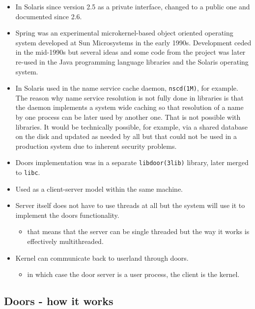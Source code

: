 \begin{itemize}
\item In Solaris since version 2.5 as a private interface, changed to a public
one and documented since 2.6.
\item Spring was an experimental microkernel-based object oriented operating
system developed at Sun Microsystems in the early 1990s. Development ceded in
the mid-1990s but several ideas and some code from the project was later
re-used in the Java programming language libraries and the Solaris operating
system.
\item In Solaris used in the name service cache daemon, \texttt{nscd(1M)}, for
example. The reason why name service resolution is not fully done in libraries
is that the daemon implements a system wide caching so that resolution of a name
by one process can be later used by another one. That is not possible with
libraries. It would be technically possible, for example, via a shared database
on the disk and updated as needed by all but that could not be used in a
production system due to inherent security problems.
\item Doors implementation was in a separate \texttt{libdoor(3lib)} library,
later merged to \texttt{libc}.
\item Used as a client-server model within the same machine.
\item Server itself does not have to use threads at all but the system will use
it to implement the doors functionality.
	\begin{itemize}
	\item that means that the server can be single threaded but the way it
	works is effectively multithreaded.
	\end{itemize}
\item Kernel can communicate back to userland through doors.
	\begin{itemize}
	\item in which case the door server is a user process, the client is
	the kernel.
	\end{itemize}
\end{itemize}

\subsection{Doors - how it works}


